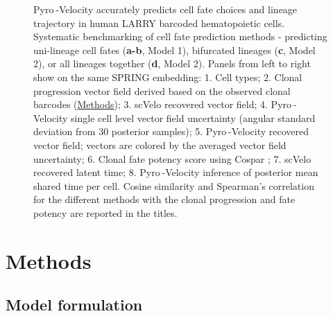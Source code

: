 \documentclass[
  sn-mathphys-num,
  lineno,
  twocolumn]{sn-jnl}
\let\oldincludegraphics\includegraphics
\renewcommand{\includegraphics}[2][]{\oldincludegraphics[#1,keepaspectratio]{#2}}
\begin{document}
\begin{figure}


\caption{\label{fig-lineage-tracing}Pyro -Velocity accurately predicts
cell fate choices and lineage trajectory in human LARRY barcoded
hematopoietic cells. Systematic benchmarking of cell fate prediction
methods - predicting uni-lineage cell fates (\textbf{a-b}, Model 1),
bifurcated lineages (\textbf{c}, Model 2), or all lineages together
(\textbf{d}, Model 2). Panels from left to right show on the same SPRING
embedding: 1. Cell types; 2. Clonal progression vector field derived
based on the observed clonal barcodes (\hyperref[sec-methods]{Methods});
3. scVelo recovered vector field; 4. Pyro -Velocity single cell level
vector field uncertainty (angular standard deviation from 30 posterior
samples); 5. Pyro -Velocity recovered vector field; vectors are colored
by the averaged vector field uncertainty; 6. Clonal fate potency score
using Cospar \citep{Wang2022-xb}; 7. scVelo recovered latent time; 8.
Pyro -Velocity inference of posterior mean shared time per cell. Cosine
similarity and Spearman's correlation for the different methods with the
clonal progression and fate potency are reported in the titles.}

\end{figure}%

\FloatBarrier
\clearpage

\newpage{}

\twocolumn

\section{Methods}\label{sec-methods}

\subsection{Model formulation}\label{sec-methods-model}
\end{document}
